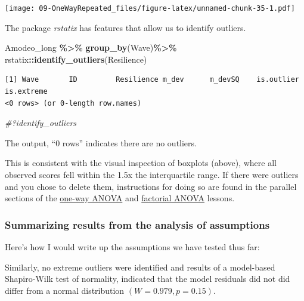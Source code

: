 \documentclass[
  11pt,
]{book}
\newenvironment{Shaded}{\begin{snugshade}}{\end{snugshade}}
\newcommand{\CommentTok}[1]{\textcolor[rgb]{0.37,0.37,0.37}{\textit{#1}}}
\newcommand{\FunctionTok}[1]{\textcolor[rgb]{0.27,0.27,0.27}{\textbf{#1}}}
\newcommand{\NormalTok}[1]{#1}
\newcommand{\SpecialCharTok}[1]{\textcolor[rgb]{0.43,0.43,0.43}{\textbf{#1}}}
\begin{document}
\texttt{[image: 09-OneWayRepeated\_files/figure-latex/unnamed-chunk-35-1.pdf]}

The package \emph{rstatix} has features that allow us to identify outliers.

\begin{Shaded}
\begin{Highlighting}[]
\NormalTok{Amodeo\_long }\SpecialCharTok{\%\textgreater{}\%}
  \FunctionTok{group\_by}\NormalTok{(Wave)}\SpecialCharTok{\%\textgreater{}\%}
\NormalTok{  rstatix}\SpecialCharTok{::}\FunctionTok{identify\_outliers}\NormalTok{(Resilience)}
\end{Highlighting}
\end{Shaded}

\begin{verbatim}
[1] Wave       ID         Resilience m_dev      m_devSQ    is.outlier is.extreme
<0 rows> (or 0-length row.names)
\end{verbatim}

\begin{Shaded}
\begin{Highlighting}[]
\CommentTok{\#?identify\_outliers}
\end{Highlighting}
\end{Shaded}

The output, ``0 rows'' indicates there are no outliers.

This is consistent with the visual inspection of boxplots (above), where all observed scores fell within the 1.5x the interquartile range. If there were outliers and you chose to delete them, instructions for doing so are found in the parallel sections of the \protect\hyperlink{oneway}{one-way ANOVA} and \protect\hyperlink{between}{factorial ANOVA} lessons.

\hypertarget{summarizing-results-from-the-analysis-of-assumptions-2}{%
\subsubsection{Summarizing results from the analysis of assumptions}\label{summarizing-results-from-the-analysis-of-assumptions-2}}

Here's how I would write up the assumptions we have tested thus far:

Similarly, no extreme outliers were identified and results of a model-based Shapiro-Wilk test of normality, indicated that the model residuals did not did differ from a normal distribution \((W = 0.979, p = 0.15)\).
\end{document}
